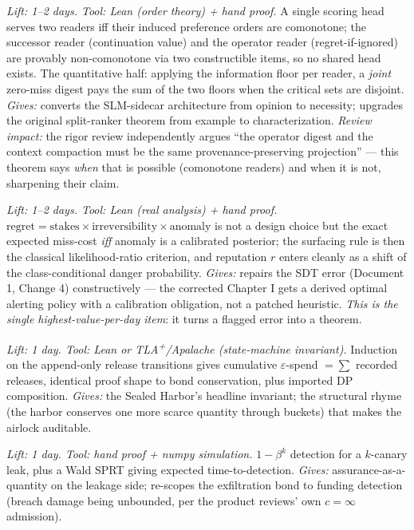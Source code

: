 \documentclass[11pt,a4paper]{article}
\begin{document}
\begin{description}[leftmargin=0em,style=unboxed]
\item[A1. Split-Digest Theorem.] \emph{Lift: 1--2 days. Tool: Lean (order theory) + hand proof.} A single scoring head serves two readers iff their induced preference orders are comonotone; the successor reader (continuation value) and the operator reader (regret-if-ignored) are provably non-comonotone via two constructible items, so no shared head exists. The quantitative half: applying the information floor per reader, a \emph{joint} zero-miss digest pays the sum of the two floors when the critical sets are disjoint. \emph{Gives:} converts the SLM-sidecar architecture from opinion to necessity; upgrades the original split-ranker theorem from example to characterization. \emph{Review impact:} the rigor review independently argues ``the operator digest and the context compaction must be the same provenance-preserving projection'' --- this theorem says \emph{when} that is possible (comonotone readers) and when it is not, sharpening their claim.

\item[A2. Deriving the regret head.] \emph{Lift: 1--2 days. Tool: Lean (real analysis) + hand proof.} $\mathrm{regret}=\text{stakes}\times\text{irreversibility}\times\text{anomaly}$ is not a design choice but the exact expected miss-cost \emph{iff} anomaly is a calibrated posterior; the surfacing rule is then the classical likelihood-ratio criterion, and reputation $r$ enters cleanly as a shift of the class-conditional danger probability. \emph{Gives:} repairs the SDT error (Document 1, Change 4) constructively --- the corrected Chapter I gets a derived optimal alerting policy with a calibration obligation, not a patched heuristic. \emph{This is the single highest-value-per-day item}: it turns a flagged error into a theorem.

\item[A3. $\varepsilon$-conservation for the release ledger.] \emph{Lift: 1 day. Tool: Lean or TLA\textsuperscript{+}/Apalache (state-machine invariant).} Induction on the append-only release transitions gives cumulative $\varepsilon$-spend $=\sum$ recorded releases, identical proof shape to bond conservation, plus imported DP composition. \emph{Gives:} the Sealed Harbor's headline invariant; the structural rhyme (the harbor conserves one more scarce quantity through buckets) that makes the airlock auditable.

\item[A4. Canary detection power + sequential leak testing.] \emph{Lift: 1 day. Tool: hand proof + numpy simulation.} $1-\beta^k$ detection for a $k$-canary leak, plus a Wald SPRT giving expected time-to-detection. \emph{Gives:} assurance-as-a-quantity on the leakage side; re-scopes the exfiltration bond to funding detection (breach damage being unbounded, per the product reviews' own $c=\infty$ admission).


\end{description}
\end{document}

